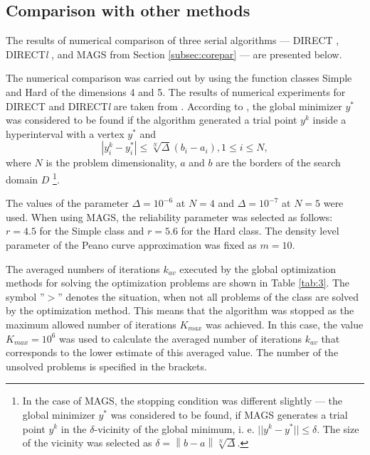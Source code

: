 \documentclass{naco}
\theoremstyle{definition}
\begin{document}
\subsection{Comparison with other methods}
The results of numerical comparison of three serial algorithms --- DIRECT
\cite{Jones}, DIRECT\textit{l} \cite{Gablonsky}, and MAGS from Section \ref{subsec:corepar} --- are presented below.

The numerical comparison was carried out by using the function classes Simple and Hard
of the dimensions 4 and 5. The results of numerical experiments for DIRECT and
DIRECT\textit{l} are taken from \cite{sergeyevKvasov2006}. According to \cite{sergeyevKvasov2006}, the global minimizer \(y^*\)
was considered to be found if the algorithm generated a trial point \(y^k\) inside
a hyperinterval with a vertex \(y^*\) and
\begin{displaymath}
    |y^k_i-y^*_i|\le \sqrt[N]{\Delta}(b_i-a_i), 1 \le i\le N,
\end{displaymath}
where \(N\) is the problem dimensionality, $a$ and $b$ are the borders of the search domain \(D\)
\footnote{In the case of MAGS, the stopping condition was different slightly --- the
global minimizer \(y^*\) was considered to be found, if MAGS generates a trial
point \(y^k\)  in the \(\delta\)-vicinity of the global minimum, i. e. \(||y^k-y^*||\le\delta\).
The size of the vicinity was selected  as \(\delta=\left\|b-a\right\|\sqrt[N]{\Delta}\).}.

The values of the parameter \(\Delta = 10^{-6}\) at \(N = 4\) and \(\Delta = 10^{-7}\)
at \(N = 5\) were used. When using MAGS, the reliability parameter was selected as
follows: \(r = 4.5\) for the Simple class and \(r = 5.6\) for the Hard class.
The density level parameter of the Peano curve approximation was fixed as \(m = 10\).

The averaged numbers of iterations $k_{av}$ executed by the global optimization methods
for solving the optimization problems are shown in Table \ref{tab:3}. The symbol ''$>$''
denotes the situation, when not all problems of the class are solved by the optimization
method. This means that the algorithm was stopped as the maximum allowed number of
iterations $K_{max}$ was achieved. In this case, the value $K_{max}= 10^6$  was used to
calculate the averaged number of iterations $k_{av}$ that corresponds to the lower estimate
of this averaged value. The number of the unsolved problems is specified in the brackets.
\end{document}
